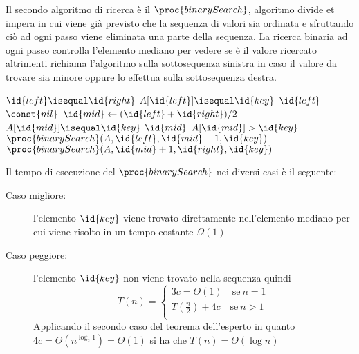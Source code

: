 Il secondo algoritmo di ricerca è il $\proc{binarySearch}$, algoritmo divide et impera
in cui viene già previsto che la sequenza di valori sia ordinata e sfruttando ciò ad ogni passo viene eliminata una parte della sequenza.\newline
La ricerca binaria ad ogni passo controlla l'elemento mediano per vedere se è il valore ricercato altrimenti richiama l'algoritmo sulla sottosequenza sinistra
in caso il valore da trovare sia minore oppure lo effettua sulla sottosequenza destra.

\begin{codebox}
\li \If $\id{left} \isequal \id{right}$
    \Then
\li                \If $A[\id{left}] \isequal \id{key}$
                   \Then
\li                            \Return $\id{left}$
\li                \Else \Return $\const{nil}$
    \End
\li \Else
\li                $\id{mid} \gets (\id{left} + \id{right}) / 2$
\li                \If $A[\id{mid}] \isequal \id{key}$
\li                   \Then \Return $\id{mid}$
                   \End
\li                \If $A[\id{mid}] > \id{key}$
                   \Then
\li                          \Return $\proc{binarySearch}(A,\id{left},\id{mid}-1,\id{key})$
\li                \Else \Return $\proc{binarySearch}(A,\id{mid}+1,\id{right},\id{key})$
    \End
\end{codebox}

Il tempo di esecuzione del $\proc{binarySearch}$ nei diversi casi è il seguente:
\begin{description}
  \item[Caso migliore:] l'elemento $\id{key}$ viene trovato direttamente nell'elemento mediano
        per cui viene risolto in un tempo costante $\Omega(1)$
  \item[Caso peggiore:] l'elemento $\id{key}$ non viene trovato nella sequenza quindi
        \begin{equation*}
           T(n) = \begin{cases} 3c = \Theta(1) \quad \text{se} \ n = 1 \\
                                T(\frac{n}{2}) + 4c \quad \text{se} \ n > 1\\
                  \end{cases}
        \end{equation*}
        Applicando il secondo caso del teorema dell'esperto in quanto $4c = \Theta(n^{\log _2 1}) = \Theta(1)$
        si ha che $T(n) = \Theta(\log n)$
\end{description}
